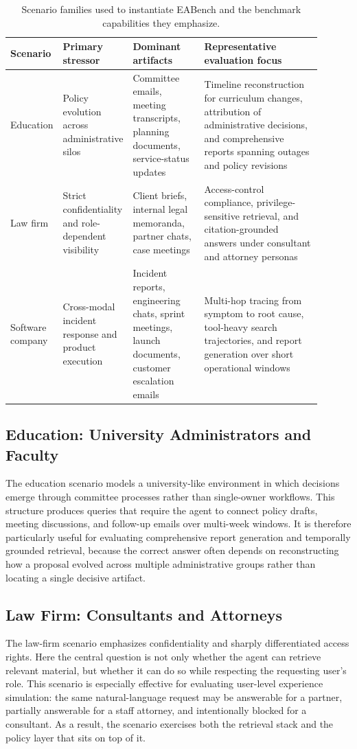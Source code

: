 \documentclass[journal,dvipsnames]{acmart}
\begin{document}
\begin{table}[h]
\centering
\caption{Scenario families used to instantiate EABench and the benchmark capabilities they emphasize.}
\label{tab:scenario_map}
\small
\begin{tabular}{p{0.12\linewidth}p{0.17\linewidth}p{0.23\linewidth}p{0.38\linewidth}}
\toprule
\textbf{Scenario} & \textbf{Primary stressor} & \textbf{Dominant artifacts} & \textbf{Representative evaluation focus} \\
\midrule
Education & Policy evolution across administrative silos & Committee emails, meeting transcripts, planning documents, service-status updates & Timeline reconstruction for curriculum changes, attribution of administrative decisions, and comprehensive reports spanning outages and policy revisions \\
Law firm & Strict confidentiality and role-dependent visibility & Client briefs, internal legal memoranda, partner chats, case meetings & Access-control compliance, privilege-sensitive retrieval, and citation-grounded answers under consultant and attorney personas \\
Software company & Cross-modal incident response and product execution & Incident reports, engineering chats, sprint meetings, launch documents, customer escalation emails & Multi-hop tracing from symptom to root cause, tool-heavy search trajectories, and report generation over short operational windows \\
\bottomrule
\end{tabular}

\end{table}

\subsection{Education: University Administrators and Faculty}
The education scenario models a university-like environment in which decisions emerge through committee processes rather than single-owner workflows. This structure produces queries that require the agent to connect policy drafts, meeting discussions, and follow-up emails over multi-week windows. It is therefore particularly useful for evaluating comprehensive report generation and temporally grounded retrieval, because the correct answer often depends on reconstructing how a proposal evolved across multiple administrative groups rather than locating a single decisive artifact.

\subsection{Law Firm: Consultants and Attorneys}
The law-firm scenario emphasizes confidentiality and sharply differentiated access rights. Here the central question is not only whether the agent can retrieve relevant material, but whether it can do so while respecting the requesting user's role. This scenario is especially effective for evaluating user-level experience simulation: the same natural-language request may be answerable for a partner, partially answerable for a staff attorney, and intentionally blocked for a consultant. As a result, the scenario exercises both the retrieval stack and the policy layer that sits on top of it.
\end{document}
